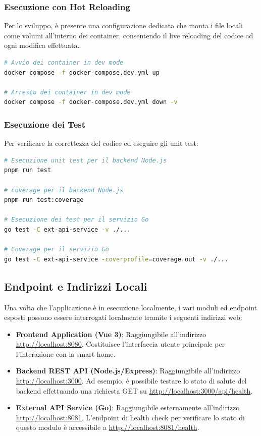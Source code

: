 \documentclass[a4paper,12pt]{article}
\begin{document}
\subsubsection{Esecuzione con Hot Reloading}
Per lo sviluppo, è presente una configurazione dedicata che monta i file locali come volumi all'interno dei container, consentendo il live reloading del codice ad ogni modifica effettuata.
\begin{lstlisting}[language=bash]
# Avvio dei container in dev mode
docker compose -f docker-compose.dev.yml up

# Arresto dei container in dev mode
docker compose -f docker-compose.dev.yml down -v
\end{lstlisting}

\subsubsection{Esecuzione dei Test}
Per verificare la correttezza del codice ed eseguire gli unit test:
\begin{lstlisting}[language=bash]
# Esecuzione unit test per il backend Node.js
pnpm run test

# coverage per il backend Node.js
pnpm run test:coverage

# Esecuzione dei test per il servizio Go
go test -C ext-api-service -v ./...

# Coverage per il servizio Go
go test -C ext-api-service -coverprofile=coverage.out -v ./...
\end{lstlisting}

\subsection{Endpoint e Indirizzi Locali}
Una volta che l'applicazione è in esecuzione localmente, i vari moduli ed endpoint esposti possono essere interrogati localmente tramite i seguenti indirizzi web:
\begin{itemize}
    \item \textbf{Frontend Application (Vue 3)}: Raggiungibile all'indirizzo \href{http://localhost:8080}{http://localhost:8080}. Costituisce l'interfaccia utente principale per l'interazione con la smart home.
    \item \textbf{Backend REST API (Node.js/Express)}: Raggiungibile all'indirizzo \href{http://localhost:3000}{http://localhost:3000}. Ad esempio, è possibile testare lo stato di salute del backend effettuando una richiesta GET su \href{http://localhost:3000/api/health}{http://localhost:3000/api/health}.
    \item \textbf{External API Service (Go)}: Raggiungibile esternamente all'indirizzo \href{http://localhost:8081}{http://localhost:8081}. L'endpoint di health check per verificare lo stato di questo modulo è accessibile a \href{http://localhost:8081/health}{http://localhost:8081/health}.
\end{itemize}
\newpage
\end{document}
